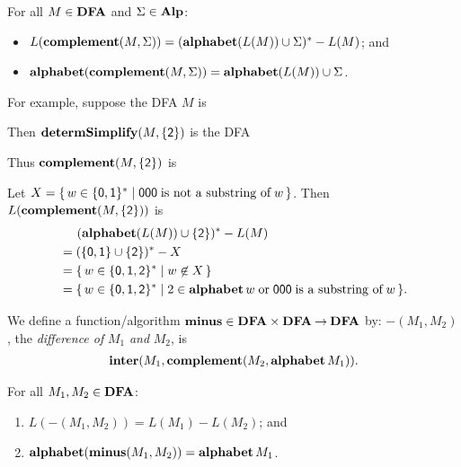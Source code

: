 \begin{theorem}
For all $M\in\mathbf{DFA}$ and $\Sigma\in\mathbf{Alp}$:
\begin{itemize}
\item $L(\mathbf{complement}(M,\Sigma)) = (\mathbf{alphabet}(L(M))\cup\Sigma)^*-L(M)$; and

\item $\mathbf{alphabet}(\mathbf{complement}(M,\Sigma)) = \mathbf{alphabet}(L(M))\cup\Sigma$.
\end{itemize}
\end{theorem}

For example, suppose the DFA $M$ is
\begin{center}

\end{center}
Then $\mathbf{determSimplify}(M,\{\mathsf{2}\})$ is the DFA
\begin{center}

\end{center}
Thus $\mathbf{complement}(M,\{\mathsf{2}\})$ is
\begin{center}

\end{center}

Let $X=\{ \, w\in\{\mathsf{0,1}\}^* \mid \mathsf{000}\;\allowbreak\mbox{is not a
    substring of}\allowbreak\;w \, \}$.  Then $L(\mathbf{complement}(M,\{\mathsf{2}\}))$ is
\begin{alignat*}{2}
&\mathrel{\hspace*{.3cm}} (\mathbf{alphabet}(L(M))\cup\{\mathsf{2}\})^*-L(M) \\
&=(\{\mathsf{0,1}\}\cup\{\mathsf{2}\})^* - X \\
&=\{ \, w\in\{\mathsf{0,1,2}\}^* \mid w\not\in X \, \} \\
&=\{ \, w\in\{\mathsf{0,1,2}\}^* \mid 2\in\mathbf{alphabet}\,w\;\allowbreak\mbox{or}\allowbreak\;
\mathsf{000}\;\allowbreak\mbox{is a substring of}\allowbreak\;w \, \} .
\end{alignat*}

We define a function/algorithm $\mathbf{minus}\in\mathbf{DFA}\times\mathbf{DFA}\mathbin{\to}\mathbf{DFA}$ by:
$\minus(M_1,M_2)$, the \emph{difference of} $M_1$ \emph{and} $M_2$, is
\begin{gather*}
\mathbf{inter}(M_1,\mathbf{complement}(M_2,{\mathbf{alphabet}\,M_1})) .
\end{gather*}

\begin{theorem}
\label{DFAMinusTheorem}
For all $M_1,M_2\in\mathbf{DFA}$:
\begin{enumerate}[\quad(1)]
\item $L(\minus(M_1,M_2)) = L(M_1)-L(M_2)$; and

\item $\mathbf{alphabet}(\mathbf{minus}(M_1,M_2)) = \mathbf{alphabet}\,M_1$.
\end{enumerate}
\end{theorem}

